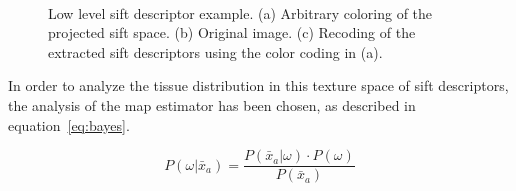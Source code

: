 \documentclass[a4paper, 10pt, conference]{llncs}      %
\begin{document}
\begin{figure}[Htbp]
\centering
{}~
\,
\caption{Low level \ac{sift} descriptor example. (a) Arbitrary coloring of the projected \acs{sift} space. (b) Original image. (c) Recoding of the extracted \ac{sift} descriptors using the color coding in (a). }
\label{fig:siftImg}
\end{figure}

In order to analyze the tissue distribution in this texture space of \ac{sift} descriptors, the analysis of the \ac{map} estimator has been chosen, as described in equation~\ref{eq:bayes}.%

\begin{equation}
P(\omega|\bar{x}_a) = \frac{P(\bar{x}_a|\omega)\cdot P(\omega)}{P(\bar{x}_a)}
\label{eq:bayes}
\end{equation}
\end{document}
